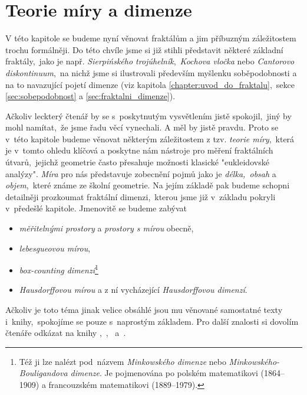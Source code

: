 \chapter{Teorie míry a dimenze}\label{chapter:teorie-miry-a-dimenze}

V této kapitole se budeme nyní věnovat fraktálům a jim příbuzným záležitostem trochu formálněji. Do této chvíle jsme si již stihli představit některé základní fraktály,~jako je např. \emph{Sierpińského trojúhelník},~\emph{Kochova vločka} nebo \emph{Cantorovo diskontinuum},~na nichž jsme si ilustrovali především myšlenku soběpodobnosti a na to navazující pojetí dimenze (viz kapitola \ref{chapter:uvod_do_fraktalu},~sekce \ref{sec:sobepodobnost} a \ref{sec:fraktalni_dimenze}).

Ačkoliv leckterý čtenář by se s~poskytnutým vysvětlením jistě spokojil,~jiný by mohl namítat,~že jsme řadu věcí vynechali. A měl by jistě pravdu. Proto se v~této kapitole budeme věnovat některým záležitostem z tzv. \emph{teorie míry},~která je v~tomto ohledu klíčová a poskytne nám nástroje pro měření fraktálních útvarů,~jejichž geometrie často přesahuje možnosti klasické "eukleidovské analýzy". \emph{Míra} pro nás představuje zobecnění pojmů jako je \emph{délka,~obsah} a \emph{objem},~které známe ze školní geometrie. Na jejím základě pak budeme schopni detailněji prozkoumat fraktální dimenzi,~kterou jsme již v~základu pokryli v~předešlé kapitole. Jmenovitě se budeme zabývat
\begin{itemize}
    \item \emph{měřitelnými prostory} a \emph{prostory s mírou} obecně,
    \item \emph{lebesgueovou mírou},
    \item \emph{box-counting dimenzí}\footnote{Též ji lze nalézt pod~názvem \emph{Minkowského dimenze} nebo \emph{Minkowského-Bouligandova dimenze}. Je pojmenována po polském matematikovi  (1864--1909) a francouzském matematikovi  (1889--1979).}
    \item \emph{Hausdorffovou mírou} a z ní vycházející \emph{Hausdorffovou dimenzí}.
\end{itemize}

Ačkoliv je toto téma jinak velice obsáhlé jsou mu věnované samostatné texty i~knihy,~spokojíme se pouze s~naprostým základem. Pro další znalosti si dovolím čtenáře odkázat na knihy \cite{Falconer2014},~\cite{Lukes2013},~\cite{Netuka2016} a~\cite{Edgar2008}.






